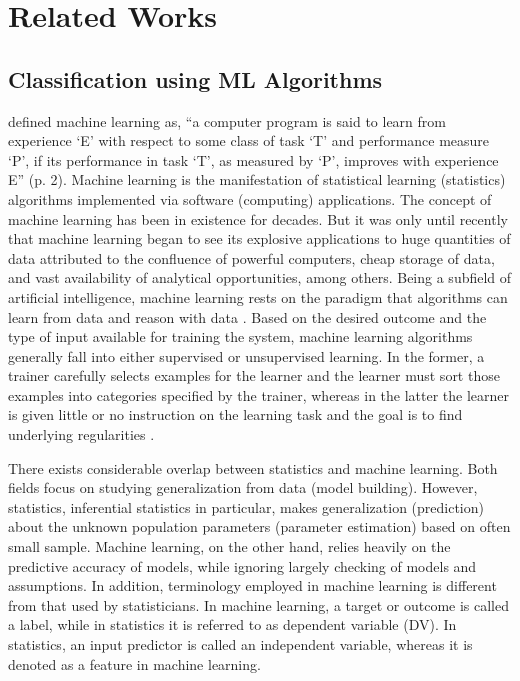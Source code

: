 \documentclass[deca,nonblindrev]{informs3} %
\begin{document}
\section{Related Works }

\subsection{Classification using ML Algorithms}

\cite{mitchell1997machine}  defined machine learning as, ``a  computer program is said to learn from experience ‘E’ with respect to some class of task ‘T’ and performance measure ‘P’, if its performance in task ‘T’, as measured by ‘P’, improves with experience E'' (p. 2). Machine learning is the manifestation of statistical learning (statistics) algorithms implemented via software (computing) applications. The concept of machine learning has been in existence for decades. But it was only until recently that machine learning began to see its explosive applications to huge quantities of data attributed to the confluence of powerful computers, cheap storage of data, and vast availability of analytical opportunities, among others. Being a subfield of artificial intelligence, machine learning rests on the paradigm that algorithms can learn from data and reason with data \citep{rao2013handbook}. Based on the desired outcome and the type of input available for training the system, machine learning algorithms generally fall into either supervised or unsupervised learning.  In the former, a trainer carefully selects examples for the learner and the learner must sort those examples into categories specified by the trainer, whereas in the latter the learner is given little or no instruction on the learning task and the goal is to find underlying regularities \citep{cottrell2006new}.

There exists considerable overlap between statistics and machine learning. Both fields focus on studying generalization from data (model building). However, statistics, inferential statistics in particular, makes generalization (prediction) about the unknown population parameters (parameter estimation) based on often small sample. Machine learning, on the other hand, relies heavily on the predictive accuracy of models, while ignoring largely checking of models and assumptions. In addition, terminology employed in machine learning is different from that used by statisticians. In machine learning, a target or outcome is called a label, while in statistics it is referred to as dependent variable (DV). In statistics, an input predictor is called an independent variable, whereas it is denoted as a feature in machine learning.  
\end{document}
